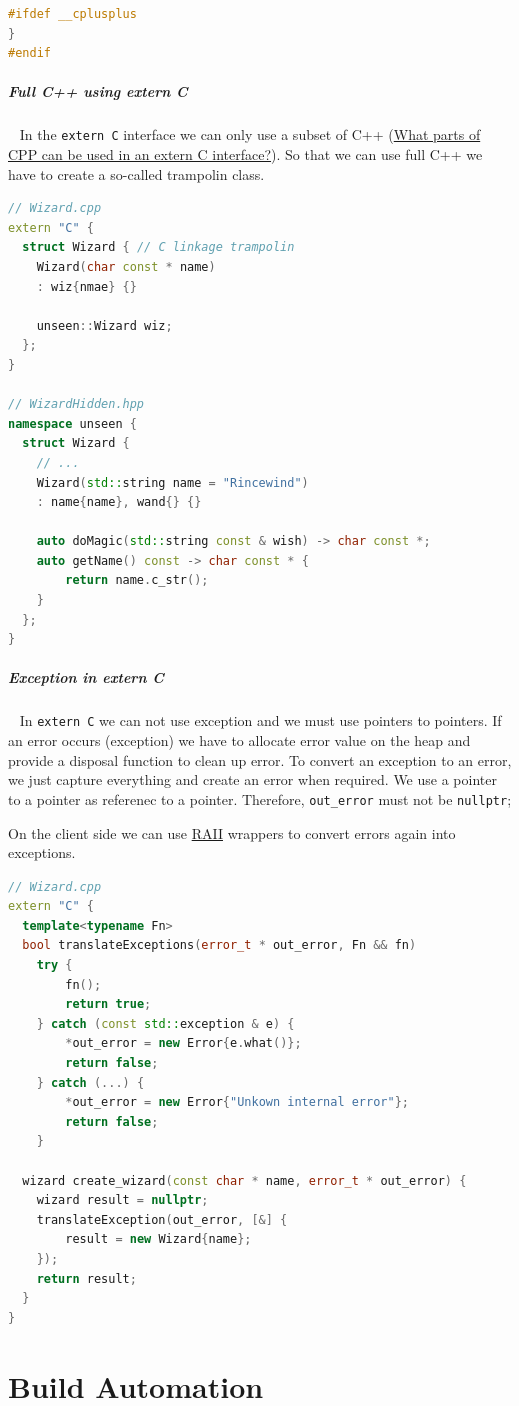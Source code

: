 \documentclass[11pt,twoside,landscape]{article}
\begin{document}
\begin{multicols}{2}
\begin{lstlisting}[language=c++,label=lst:example-for-a-extern-c-interface,caption={Example for a extern C interface},captionpos=b,numbers=none]
#ifdef __cplusplus
}
#endif
\end{lstlisting}

\subparagraph{Full C++ using extern C} \
\label{sec:org8fe4cfb}
In the \texttt{extern C} interface we can only use a subset of C++ (\href{../../../roam/20230706185259-what_parts_of_cpp_can_be_used_in_an_extern_c_interface.org}{What parts of CPP can be used in an extern C interface?}).
So that we can use full C++ we have to create a so-called trampolin class.

\begin{lstlisting}[language=c++,label=lst:example-for-a-trampolin-class,caption={Example for a trampolin class},captionpos=b,numbers=none]
// Wizard.cpp
extern "C" {
  struct Wizard { // C linkage trampolin
    Wizard(char const * name)
    : wiz{nmae} {}

    unseen::Wizard wiz;
  };
}

// WizardHidden.hpp
namespace unseen {
  struct Wizard {
    // ...
    Wizard(std::string name = "Rincewind")
    : name{name}, wand{} {}

    auto doMagic(std::string const & wish) -> char const *;
    auto getName() const -> char const * {
        return name.c_str();
    }
  };
}
\end{lstlisting}

\subparagraph{Exception in extern C} \
\label{sec:org8951f93}
In \texttt{extern C} we can not use exception and we must use pointers to pointers.
If an error occurs (exception) we have to allocate error value on the heap and provide a disposal function to clean up error.
To convert an exception to an error, we just capture everything and create an error when required.
We use a pointer to a pointer as referenec to a pointer.
Therefore, \texttt{out\_error} must not be \texttt{nullptr};

On the client side we can use \href{../../../roam/20220118172628-resource_acquisition_is_initialization.org}{RAII} wrappers to convert errors again into exceptions.


\begin{lstlisting}[language=c++,numbers=none]
// Wizard.cpp
extern "C" {
  template<typename Fn>
  bool translateExceptions(error_t * out_error, Fn && fn)
    try {
        fn();
        return true;
    } catch (const std::exception & e) {
        *out_error = new Error{e.what()};
        return false;
    } catch (...) {
        *out_error = new Error{"Unkown internal error"};
        return false;
    }

  wizard create_wizard(const char * name, error_t * out_error) {
    wizard result = nullptr;
    translateException(out_error, [&] {
        result = new Wizard{name};
    });
    return result;
  }
}
\end{lstlisting}

\section{Build Automation}
\label{sec:org225deeb}
\end{multicols}
\end{document}
